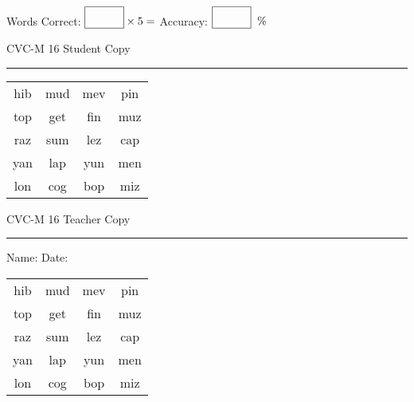 \documentclass{memoir}
\begin{document}
\small

Words Correct: $\fbox{\phantom{\huge 100}} \times 5 = $ Accuracy: $\fbox{\phantom{\huge 100}}\;\; \%$ 

\vfill

\newpage


\footnotesize \noindent
CVC-M 16 \hfill Student Copy
\smallskip
\hrule

\Large

\setlength{\tabcolsep}{14pt}
\def\arraystretch{2}

{\selectfont


\begin{vplace}[0.5]
\begin{center}
\begin{tabular}{cccc}
hib & mud & mev & pin \\
top & get & fin & muz \\
raz & sum & lez & cap \\
yan & lap & yun & men \\
lon & cog & bop & miz \\
\end{tabular}
\end{center}
\end{vplace}

}

\newpage

\footnotesize \noindent
CVC-M 16 \hfill Teacher Copy
\smallskip
\hrule

\small

\vfill

\noindent
Name: \underline{\hspace{1.75in}} \hfill Date: \underline{\hspace{1in}}

\Large

{\selectfont


\begin{vplace}[0.5]
\begin{center}
\begin{tabular}{cccc}
hib & mud & mev & pin \\
top & get & fin & muz \\
raz & sum & lez & cap \\
yan & lap & yun & men \\
lon & cog & bop & miz \\
\end{tabular}
\end{center}
\end{vplace}



}
\end{document}
